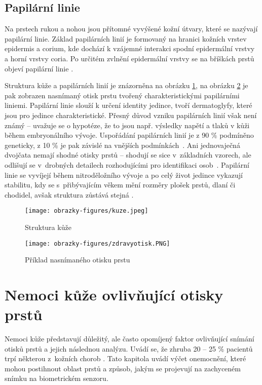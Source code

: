 \subsection{Papilární linie}
Na prstech rukou a nohou jsou přítomné vyvýšené kožní útvary, které se nazývají papilární linie. Základ papilárních linií je formovaný na hranici kožních vrstev epidermis a corium, kde dochází k vzájemné interakci spodní epidermální vrstvy a horní vrstvy coria. Po určitém zvlnění epidermální vrstvy se na bříškách prstů objeví papilární linie \cite{DermatologickeFaktory}. 

Struktura kůže a papilárních linií je znázorněna na obrázku \ref{fig:kuze}, na obrázku \ref{fig:zdravyotisk} je pak zobrazen nasnímaný otisk prstu tvořený charakteristickými papilárními liniemi. Papilární linie slouží k určení identity jedince, tvoří dermatoglyfy, které jsou pro jedince charakteristické. Přesný důvod vzniku papilárních linií však není známý -- uvažuje se o hypotéze, že to jsou např. výsledky napětí a tlaků v kůži během embryonálního vývoje. Uspořádání papilárních linií je z 90 \% podmíněno geneticky, z 10 \% je pak závislé na vnějších podmínkách~\cite{Dermatoglyfika}. Ani jednovaječná dvojčata nemají shodné otisky prstů -- shodují se sice v~základních vzorech, ale odlišují se v~drobných detailech rozhodujícími pro identifikaci osob~\cite{Dermatoglyfika}. Papilární linie se vyvíjejí během nitroděložního vývoje a po celý život jedince vykazují stabilitu, kdy se s~přibývajícím věkem mění rozměry plošek prstů, dlaní či chodidel, avšak struktura zůstává stejná \cite{DermatologickeFaktory}. \\

\begin{figure}[!htbp]
    \centering
    \texttt{[image: obrazky-figures/kuze.jpeg]}
    \caption{Struktura kůže \cite{DermatologickeFaktory}}
    \label{fig:kuze}
\end{figure}

\begin{figure}[!htbp]
    \centering
    \texttt{[image: obrazky-figures/zdravyotisk.PNG]}
    \caption{Příklad nasnímaného otisku prstu \cite{BIOotiskyLecture}}
    \label{fig:zdravyotisk}
\end{figure}

\section{Nemoci kůže ovlivňující otisky prstů}
\label{sec:nemoci}
Nemoci kůže představují důležitý, ale často opomíjený faktor ovlivňující snímání otisků prstů a jejich následnou analýzu. Uvádí se, že zhruba 20 -- 25 \% pacientů trpí některou z~kožních chorob \cite{InfluenceSkinDiseases}. Tato kapitola uvádí výčet onemocnění, které mohou postihnout oblast prstů a způsob, jakým se projevují na zachyceném snímku na biometrickém senzoru. 
